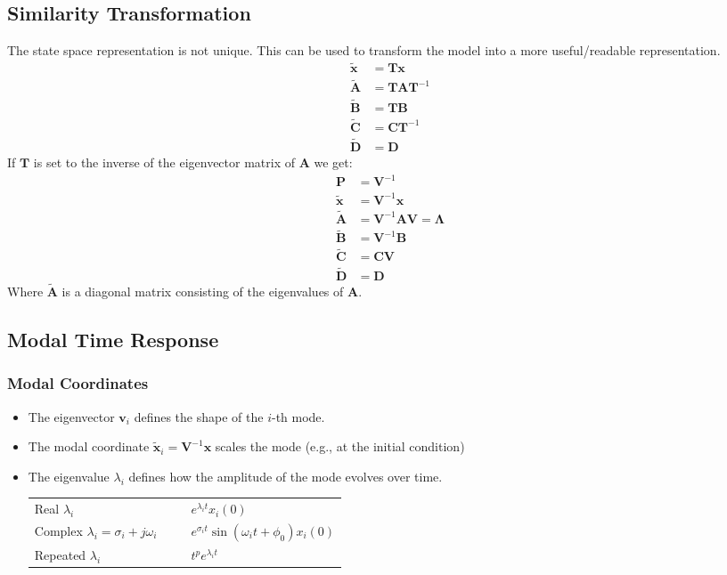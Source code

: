 \subsection{Similarity Transformation}
The state space representation is not unique. This can be used to transform the model into a more \flqq{}useful/readable\frqq{} representation.
\begin{align*}
    \tilde{\mathbf{x}} & = \mathbf{Tx}       \\
    \tilde{\mathbf{A}} & = \mathbf{TAT}^{-1} \\
    \tilde{\mathbf{B}} & = \mathbf{TB}       \\
    \tilde{\mathbf{C}} & = \mathbf{CT}^{-1}  \\
    \tilde{\mathbf{D}} & = \mathbf{D}
\end{align*}
If $\mathbf{T}$ is set to the inverse of the eigenvector matrix of $\mathbf{A}$ we get:
\begin{align*}
    \mathbf{P}         & = \mathbf{V}^{-1}                           \\
    \tilde{\mathbf{x}} & = \mathbf{V}^{-1}\mathbf{x}                 \\
    \tilde{\mathbf{A}} & = \mathbf{V}^{-1}\mathbf{AV} = \bm{\Lambda} \\
    \tilde{\mathbf{B}} & = \mathbf{V}^{-1}\mathbf{B}                 \\
    \tilde{\mathbf{C}} & = \mathbf{CV}                               \\
    \tilde{\mathbf{D}} & = \mathbf{D}
\end{align*}
Where $\tilde{\mathbf{A}}$ is a diagonal matrix consisting of the eigenvalues of $\mathbf{A}$.

\subsection{Modal Time Response}
\subsubsection{Modal Coordinates}
\begin{itemize}
    \item The eigenvector $\mathbf{v}_i$ defines the shape of the $i$-th mode.
    \item The modal coordinate $\tilde{\mathbf{x}}_i=\mathbf{V}^{-1}\mathbf{x}$ scales the mode (e.g., at the initial condition)
    \item The eigenvalue $\lambda_i$ defines how the amplitude of the mode evolves over time.

          \begin{tabularx}{\linewidth}{@{}p{0.5\linewidth}X@{}}
              \quad Real $\lambda_i$                            & \textrightarrow{} $e^{\lambda_i t}x_i(0)$                         \\
              \quad Complex $\lambda_i = \sigma_i + j \omega_i$ & \textrightarrow{} $e^{\sigma_i t}\sin(\omega_i t + \phi_0)x_i(0)$ \\
              \quad Repeated $\lambda_i$                        & \textrightarrow{} $t^p e^{\lambda_i t}$
          \end{tabularx}
\end{itemize}

